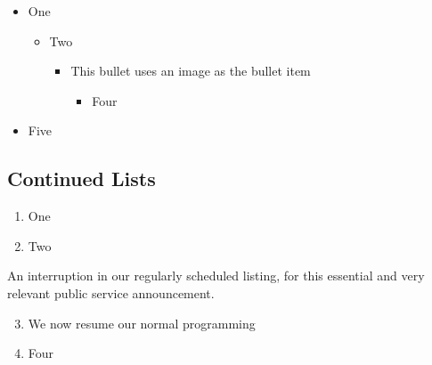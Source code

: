 \documentclass[11pt]{article}
\begin{document}
\begin{itemize}
\item One
\begin{itemize}
\item Two
\begin{itemize}
\item This bullet uses an image as the bullet item
\begin{itemize}
\item Four
\end{itemize}
\end{itemize}
\end{itemize}
\item Five
\end{itemize}

\subsection[{Continued Lists}]{\protect\textcolor{hex4F81BD}{Continued Lists}}\label{_Toc1471533984}\label{continued-lists}

\begin{enumerate}
\item One
\item Two
\end{enumerate}

{\leftskip=36pt An interruption in our regularly scheduled listing, for this essential and very relevant public service announcement.\par}

\begin{enumerate}
\setcounter{enumi}{2}
\item We now resume our normal programming
\item Four
\end{enumerate}

\theendnotes
\end{document}
